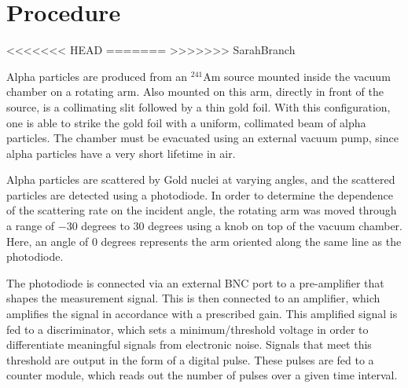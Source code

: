 \documentclass[a4paper]{article}
\begin{document}
\begin{figure}[H]
\centering
\label{name}
\end{figure}

\section{Procedure}

<<<<<<< HEAD
\qq
=======
>>>>>>> SarahBranch

\qq Alpha particles are produced from an $^{241}$Am source mounted inside the vacuum chamber on a rotating arm. Also mounted on this arm, directly in front of the source, is a collimating slit followed by a thin gold foil. With this configuration, one is able to strike the gold foil with a uniform, collimated beam of alpha particles. The chamber must be evacuated using an external vacuum pump, since alpha particles have a very short lifetime in air.

\qq Alpha particles are scattered by Gold nuclei at varying angles, and the scattered particles are detected using a photodiode. In order to determine the dependence of the scattering rate on the incident angle, the rotating arm was moved through a range of $-30$ degrees to $30$ degrees using a knob on top of the vacuum chamber. Here, an angle of 0 degrees represents the arm oriented along the same line as the photodiode.

\qq The photodiode is connected via an external BNC port to a pre-amplifier that shapes the measurement signal. This is then connected to an amplifier, which amplifies the signal in accordance with a prescribed gain. This amplified signal is fed to a discriminator, which sets a minimum/threshold voltage in order to differentiate meaningful signals from electronic noise. Signals that meet this threshold are output in the form of a digital pulse. These pulses are fed to a counter module, which reads out the number of pulses over a given time interval.
\end{document}

